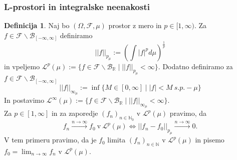 \documentclass[a4paper,12pt]{article}
\theoremstyle{definition} %
\newtheorem{definicija}{Definicija}[section]
\theoremstyle{plain} %
\newcommand{\R}{\mathbb{R}}
\newcommand{\N}{\mathbb{N}}
\newcommand{\F}{\mathcal{F}}
\newcommand{\Le}{\mathcal{L}}
\begin{document}
        \subsubsection{L-prostori in integralske neenakosti}
            \begin{definicija}
                Naj bo $(\Omega, \F, \mu)$ prostor z mero in $p\in[1, \infty).$ Za $f \in \F\backslash\mathcal{B}_{[-\infty, \infty]}$ definiramo
                $$
                    ||f||_{p_\mu} := \left(\int |f|^pd\mu\right)^{\frac{1}{p}}
                $$
                in vpeljemo $ \mathcal{L}^p(\mu) := \{f \in \F\backslash\mathcal{B}_{\R} \mid ||f||_{p_\mu} < \infty\}.$
                Dodatno definiramo za $f \in \F\backslash\mathcal{B}_{[-\infty, \infty]}$
                $$
                    ||f||_{\infty_\mu} := \inf\{M \in [0, \infty] \mid |f| < M \ s.p.-\mu\}
                $$
                In postavimo $\mathcal{L}^\infty(\mu) := \{f \in \F\backslash\mathcal{B}_{\R} \mid ||f||_{\infty_\mu} < \infty\}.$ \\
                Za $p\in[1, \infty]$ in za zaporedje $(f_n)_{n\in\N_0}$ v $\mathcal{L}^p(\mu)$ pravimo, da 
                $$
                f_n \xrightarrow{n \rightarrow \infty}{} f_0 \ \text{v} \ \Le^p(\mu) \iff ||f_n - f_0||_{p_\mu} \xrightarrow{n \rightarrow \infty}{} 0.
                $$
                V tem primeru pravimo, da je $f_0$ limita $(f_n)_{n\in\N}$ v $\mathcal{L}^p(\mu)$ in pisemo $f_0 = \lim_{n\rightarrow\infty}f_n$ v $\mathcal{L}^p(\mu)$.
                

            \end{definicija}
\end{document}
